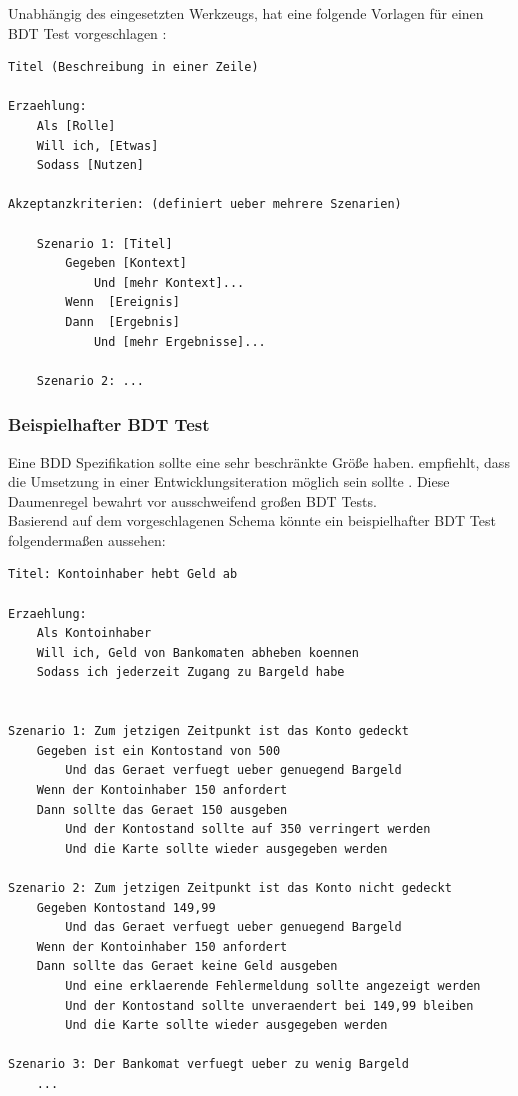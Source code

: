 Unabhängig des eingesetzten Werkzeugs, hat \citeauthor{north_whats_2007} eine folgende Vorlagen für einen \Gls{BDT} Test vorgeschlagen \cite{north_whats_2007}:

\begin{lstlisting}[caption=Vorlage für BDT Tests in Prosatext, label=lst:bdt_template]
Titel (Beschreibung in einer Zeile)
 
Erzaehlung:
	Als [Rolle]
	Will ich, [Etwas]
	Sodass [Nutzen]
 
Akzeptanzkriterien: (definiert ueber mehrere Szenarien)
 
	Szenario 1: [Titel]
		Gegeben [Kontext]
	  		Und [mehr Kontext]...
		Wenn  [Ereignis]
		Dann  [Ergebnis]
	  		Und [mehr Ergebnisse]...
	 
	Szenario 2: ...
\end{lstlisting}

\subsubsection{Beispielhafter BDT Test}
\label{sec:bdt_bsp}
Eine \Gls{BDD} Spezifikation sollte eine sehr beschränkte Größe haben. \citeauthor{north_whats_2007} empfiehlt, dass die Umsetzung in einer Entwicklungsiteration möglich sein sollte \cite{north_whats_2007}. Diese Daumenregel bewahrt vor ausschweifend großen \Gls{BDT} Tests.\\
Basierend auf dem vorgeschlagenen Schema könnte ein beispielhafter \Gls{BDT} Test folgendermaßen aussehen:

\begin{lstlisting}[caption=Beispielhafter BDT Test, label=lst:bdt_test]
Titel: Kontoinhaber hebt Geld ab
 
Erzaehlung:
	Als Kontoinhaber
	Will ich, Geld von Bankomaten abheben koennen
	Sodass ich jederzeit Zugang zu Bargeld habe
 
 
Szenario 1: Zum jetzigen Zeitpunkt ist das Konto gedeckt
	Gegeben ist ein Kontostand von 500
  		Und das Geraet verfuegt ueber genuegend Bargeld
	Wenn der Kontoinhaber 150 anfordert
	Dann sollte das Geraet 150 ausgeben
  		Und der Kontostand sollte auf 350 verringert werden
  		Und die Karte sollte wieder ausgegeben werden
 
Szenario 2: Zum jetzigen Zeitpunkt ist das Konto nicht gedeckt
	Gegeben Kontostand 149,99
  		Und das Geraet verfuegt ueber genuegend Bargeld
	Wenn der Kontoinhaber 150 anfordert
	Dann sollte das Geraet keine Geld ausgeben
		Und eine erklaerende Fehlermeldung sollte angezeigt werden
  		Und der Kontostand sollte unveraendert bei 149,99 bleiben
  		Und die Karte sollte wieder ausgegeben werden

Szenario 3: Der Bankomat verfuegt ueber zu wenig Bargeld
	...
\end{lstlisting}

